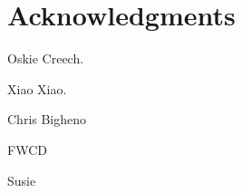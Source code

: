 
\chapter{Acknowledgments} %

\label{Acknowledgments} %



Oskie Creech. \par
Xiao Xiao. \par
Chris Bigheno \par
FWCD \par
Susie \par